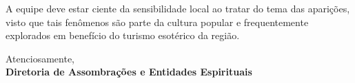 {\begin{minipage}{0.9\textwidth}
\vspace{0.3cm}
\noindent
A equipe deve estar ciente da sensibilidade local ao tratar do tema das aparições, visto que tais fenômenos são parte da cultura popular e frequentemente explorados em benefício do turismo esotérico da região.

\vspace{0.3cm}
\noindent
Atenciosamente, \\
\vspace{0.3cm}
\textbf{Diretoria de Assombrações e Entidades Espirituais} \\

\end{minipage}
}


